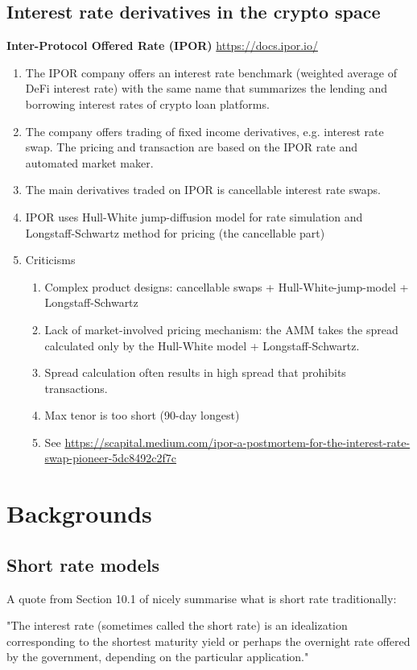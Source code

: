 \documentclass[square]{article} %
\theoremstyle{plain}
\theoremstyle{definition} %
\begin{document}
\subsection{Interest rate derivatives in the crypto space}
{\bf Inter-Protocol Offered Rate (IPOR)} \url{https://docs.ipor.io/}
\begin{enumerate}
  \item The IPOR company offers an interest rate benchmark (weighted average of DeFi interest rate) with the same name that 
  summarizes the lending and borrowing interest rates of crypto loan platforms.
  \item The company offers trading of fixed income derivatives, e.g. interest rate swap. 
  The pricing and transaction are based on the IPOR rate and automated market maker. 
  \item The main derivatives traded on IPOR is cancellable interest rate swaps.
  \item IPOR uses Hull-White jump-diffusion model for rate simulation and Longstaff-Schwartz method for pricing (the cancellable part)
  \item Criticisms
  \begin{enumerate}
    \item Complex product designs: cancellable swaps + Hull-White-jump-model + Longstaff-Schwartz 
    \item Lack of market-involved pricing mechanism: the AMM takes the spread calculated only by the Hull-White model + Longstaff-Schwartz. 
    \item Spread calculation often results in high spread that prohibits transactions. 
    \item Max tenor is too short (90-day longest) 
    \item See \url{https://scapital.medium.com/ipor-a-postmortem-for-the-interest-rate-swap-pioneer-5dc8492c2f7c}
  \end{enumerate}
\end{enumerate}




\section{Backgrounds}
\subsection{Short rate models}
A quote from Section 10.1 of \cite{Shreve2004a} nicely summarise what is short rate traditionally:
\begin{displayquote}
  "The interest rate (sometimes called the short rate) is an {\color{red} idealization} corresponding to the shortest maturity yield or perhaps the overnight rate offered by the government, depending on the particular application."
\end{displayquote}
\end{document}
